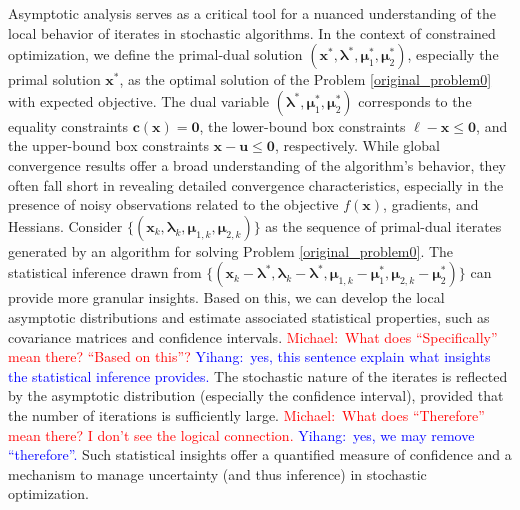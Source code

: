 \documentclass[aos]{imsart}
\numberwithin{equation}{section}
\theoremstyle{plain}
\newcommand{\michael}[1]{\textcolor{red}{Michael:\ #1}}
\newcommand{\yihang}[1]{\textcolor{blue}{Yihang:\ #1}}
\begin{document}
Asymptotic analysis serves as a critical tool for a nuanced understanding of the local behavior of iterates in stochastic algorithms. In the context of constrained optimization, we define the primal-dual solution $(\bm{x}^{*}, \bm{\lambda}^{*}, \bm{\mu}_1^{*}, \bm{\mu}_2^{*})$, especially the primal solution $\bm{x}^{*}$, as the optimal solution of the Problem \eqref{original_problem0} with expected objective. 
The dual variable $(\bm{\lambda}^{*}, \bm{\mu}_1^{*}, \bm{\mu}_2^{*})$ corresponds to the equality constraints $\bm{c}(\bm{x}) = \bm{0}$, the lower-bound box constraints $\bm{\ell} - \bm{x} \leq \bm{0}$, and the upper-bound box constraints  $\bm{x} - \bm{u} \leq \bm{0}$, respectively. 
While global convergence results offer a broad understanding of the algorithm's behavior, they often fall short in revealing detailed convergence characteristics, especially in the presence of noisy observations related to the objective \(f(\bm{x})\), gradients, and Hessians.
Consider $\{(\bm{x}_k, \bm{\lambda}_{k}, \bm{\mu}_{1,k}, \bm{\mu}_{2,k})\}$ as the sequence of primal-dual iterates generated by an algorithm for solving Problem \eqref{original_problem0}. The statistical inference drawn from $\{(\bm{x}_k - \bm{\lambda}^{*}, \bm{\lambda}_{k} - \bm{\lambda}^{*}, \bm{\mu}_{1,k} - \bm{\mu}_1^{*}, \bm{\mu}_{2,k} - \bm{\mu}_2^{*})\}$ 
can provide more granular insights.
Based on this, we can develop the local asymptotic distributions and estimate associated statistical properties, such as covariance matrices and confidence intervals. 
\michael{What does ``Specifically'' mean there?  ``Based on this''?}
\yihang{yes, this sentence explain what insights the statistical inference provides.}
The stochastic nature of the iterates is reflected by the asymptotic distribution (especially the confidence interval), provided that the number of iterations is sufficiently large. 
\michael{What does ``Therefore'' mean there? I don't see the logical connection.}
\yihang{yes, we may remove ``therefore''.}
Such statistical insights offer a quantified measure of confidence and a mechanism to manage uncertainty (and thus inference) in stochastic optimization. 
\end{document}
